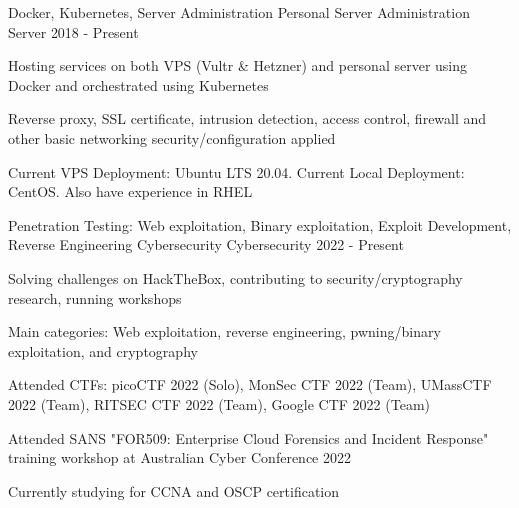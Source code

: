 

\begin{cventries}

  \cventry
    {Docker, Kubernetes, Server Administration}
    {Personal Server Administration}
    {Server}
    {2018 - Present}
    {
      \begin{cvitems}
        \item{Hosting services on both VPS (Vultr \& Hetzner) and personal server using Docker and orchestrated using Kubernetes}
        \item{Reverse proxy, SSL certificate, intrusion detection, access control, firewall and other basic networking security/configuration applied}
        \item{Current VPS Deployment: Ubuntu LTS 20.04. Current Local Deployment: CentOS. Also have experience in RHEL}
      \end{cvitems}
    }



  \cventry
    {Penetration Testing: Web exploitation, Binary exploitation, Exploit Development, Reverse Engineering}
    {Cybersecurity}
    {Cybersecurity}
    {2022 - Present}
    {
      \begin{cvitems}
        \item{Solving challenges on HackTheBox, contributing to security/cryptography research, running workshops}
        \item{Main categories: Web exploitation, reverse engineering, pwning/binary exploitation, and cryptography}
        \item{Attended CTFs: picoCTF 2022 (Solo), MonSec CTF 2022 (Team), UMassCTF 2022 (Team), RITSEC CTF 2022 (Team), Google CTF 2022 (Team)}
        \item{Attended SANS "FOR509: Enterprise Cloud Forensics and Incident Response" training workshop at Australian Cyber Conference 2022}
        \item{Currently studying for CCNA and OSCP certification}
      \end{cvitems}
    }

\end{cventries}
